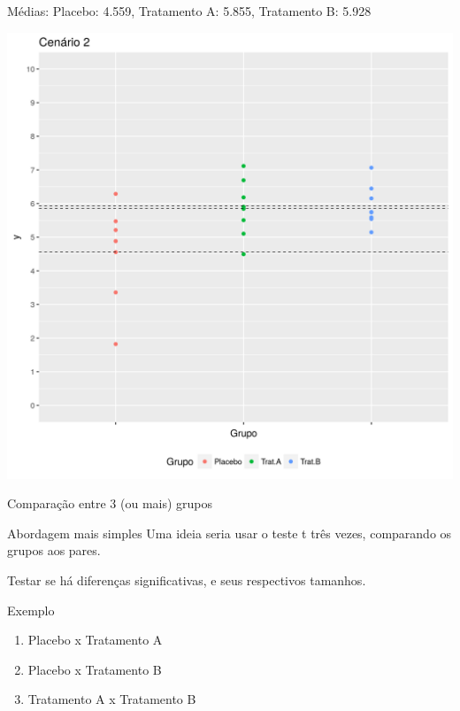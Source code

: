 \documentclass{beamer}
\begin{document}
\begin{frame}{Médias: Placebo: 4.559, Tratamento A: 5.855, Tratamento B: 5.928}
  \begin{center}
    \includegraphics[height=.9\textheight]{Cap13-30/cenario2_medias}

  \end{center}
\end{frame}

\begin{frame}{Comparação entre 3 (ou mais) grupos}
  \begin{block}{Abordagem mais simples}
    Uma ideia seria usar o teste t três vezes, comparando os grupos aos pares.

    \bigskip
    Testar se há diferenças significativas, e seus respectivos tamanhos.
  \end{block}

  \begin{exampleblock}{Exemplo}
    \begin{enumerate}
    \item Placebo x Tratamento A
    \item Placebo x Tratamento B
    \item Tratamento A x Tratamento B
    \end{enumerate}
  \end{exampleblock}
\end{frame}
\end{document}
